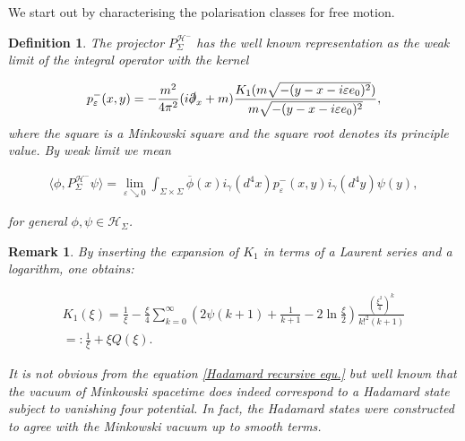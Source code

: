 \documentclass[a4paper,11pt]{article}
\newtheorem{de}{Definition}
\newtheorem{rmk}{Remark}
\begin{document}
We start out by characterising the polarisation classes for free motion.
\begin{de}
The projector \(P^{\mathcal{H}^-}_{\Sigma} \) has the well known representation as the weak limit of the integral operator 
with the kernel\cite{ivp2}

\begin{equation}
p^-_\varepsilon(x,y)= -\frac{m^2}{4\pi^2}(i\slashed{\partial}_x+m) \frac{K_1(m \sqrt{-(y-x-i \varepsilon e_0)^2})}{m \sqrt{-(y-x-i \varepsilon e_0)^2}},
\end{equation}
where the square is a Minkowski square and the square root denotes its principle value. By weak limit we mean

\begin{align}
\langle \phi, P^{\mathcal{H}^-}_{\Sigma} \psi\rangle = \lim_{\varepsilon \searrow 0} \int_{\Sigma\times \Sigma} \overline{\phi}(x) i_\gamma(d^4x) p^-_\varepsilon(x,y ) i_\gamma(d^4y) \psi(y),
\end{align}

for general \(\phi, \psi \in \mathcal{H}_\Sigma\).
\end{de}

\begin{rmk}
By inserting the expansion of \(K_1\) in terms of a Laurent series and a logarithm, \cite{abramowitz1965handbook} one obtains:

\begin{align}\label{K1series}
K_1(\xi) = \frac{1}{\xi}- \frac{\xi}{4} \sum_{k=0}^\infty \left(2 \psi(k+1)+\frac{1}{k+1}-2 \ln\frac{ \xi}{2} \right) \frac{\left(\frac{\xi^2}{4}\right)^k}{k!^2 (k+1)}\\\label{def:Q}
=:\frac{1}{\xi} + \xi Q(\xi).
\end{align}

It is not obvious from the equation \eqref{Hadamard recursive equ.} but well known that the
 vacuum of Minkowski spacetime does indeed
correspond to  a Hadamard state subject to vanishing four potential. In fact, the Hadamard states were constructed to 
agree with the Minkowski vacuum up to smooth terms.
\end{rmk}
\end{document}
